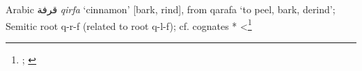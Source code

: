\begin{etymology}\label{ety:qirfa}
Arabic {قرفة} \textit{qirfa} `cinnamon' [bark, rind], from qarafa `to peel, bark, derind'; Semitic root q-r-f (related to root q-l-f); cf. cognates *
<\footnote{\textcite[888]{wehr_dictionary_1976}; \textcite[427]{leslau_comparative_1991}}
\end{etymology}